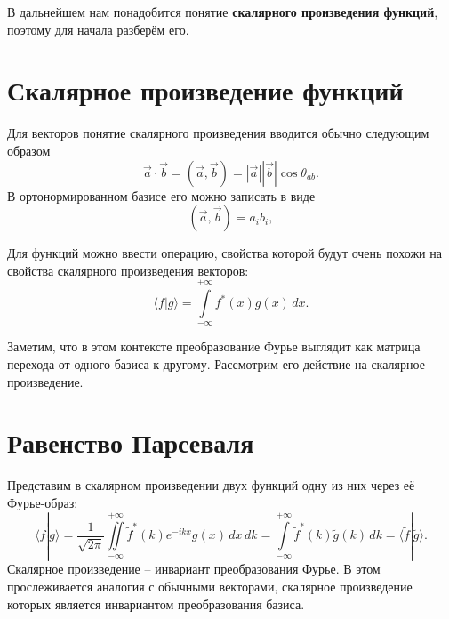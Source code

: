 В дальнейшем нам понадобится понятие \textbf{скалярного произведения функций}, поэтому
для начала разберём его.

\section{Скалярное произведение функций}

Для векторов понятие скалярного произведения вводится обычно следующим
образом
\[
    \vec{a} \cdot \vec{b} = (\vec{a}, \vec{b}) = |\vec{a}| |\vec{b}| \cos\theta_{ab}.
\]
В ортонормированном базисе его можно записать в виде
\[
    (\vec{a}, \vec{b}) = a_ib_i,
\]

Для функций можно ввести операцию, свойства которой будут очень похожи на
свойства скалярного произведения векторов:
\[
    \langle f | g \rangle = \int\limits_{-\infty}^{+\infty} f^\ast(x) g(x)\,
    dx.
\]

Заметим, что в этом контексте преобразование Фурье выглядит как матрица
перехода от одного базиса к другому. Рассмотрим его действие на
скалярное произведение.

\section{Равенство Парсеваля}

Представим в скалярном произведении двух функций одну из них через её
Фурье-образ:
\[
    \langle f | g \rangle =
    \frac{1}{\sqrt{2\pi}}\iint\limits_{-\infty}^{+\infty}
    \tilde{f}^\ast(k) e^{-ikx} g(x) \,dx\,dk=
    \int\limits_{-\infty}^{+\infty} \tilde{f}^\ast(k) \tilde{g}(k)\,dk =
    \langle \tilde{f} | \tilde{g} \rangle.
\]
Скалярное произведение -- инвариант преобразования Фурье. В этом
прослеживается аналогия с обычными векторами, скалярное произведение которых
является инвариантом преобразования базиса.

